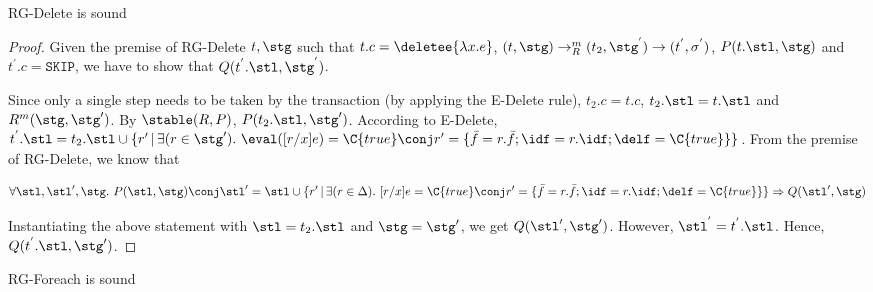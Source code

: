 \begin{theorem}
RG-Delete is sound
\end{theorem}

\begin{proof}
Given the premise of RG-Delete $t, \stg$ such that $t.c = \deletee{\lambda x.e}$, $(t, \stg) \rightarrow_{R}^{m} (t_2, \stg^{'}) \rightarrow (t^{'}, \sigma^{'})$, $P(t.\stl, \stg)$ and $t^{'}.c = \texttt{SKIP}$, we have to show that $Q(t^{'}.\stl, \stg^{'})$. 

Since only a single step needs to be taken by the transaction (by applying the E-Delete rule), $t_2.c = t.c$, $t_2.\stl = t.\stl$ and $R^m(\stg, \stg')$. By $\stable(R, P)$, $P(t_2.\stl, \stg')$. According to E-Delete,  $t^{'}.\stl = t_2.\stl \cup \{r' \,|\, \exists(r\in\stg').~ \eval([r/x]e)=\C{true} \conj r'=\{\bar{f}=r.\bar{f}; \idf=r.\idf;\delf=\C{true}\}\}$. From the premise of RG-Delete, we know that 

$$
\forall\stl,\stl',\stg.~P(\stl,\stg) \conj 
  \stl' = \stl \cup \{r' \,|\, \exists(r\in\Delta).~ [r/x]e=\C{true}
        \conj r'=\{\bar{f}=r.\bar{f}; \idf=r.\idf;
        \delf=\C{true}\}\}  \Rightarrow 
  Q(\stl',\stg)
$$

Instantiating the above statement with $\stl = t_2.\stl$ and $\stg = \stg'$, we get $Q(\stl',\stg')$. However, $\stl^{'} = t^{'}.\stl$. Hence, $Q(t^{'}.\stl,\stg')$.
\end{proof}


\begin{theorem}
RG-Foreach is sound
\end{theorem}

